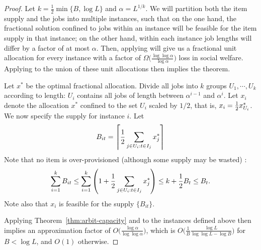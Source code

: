 \begin{proof}
  Let $k=\frac 12\min\{B,\log L\}$ and $\alpha=L^{1/k}$. We will
  partition both the item supply and the jobs into multiple instances,
  such that on the one hand, the fractional solution confined to jobs
  within an instance will be feasible for the item supply in that
  instance; on the other hand, within each instance job lengths will
  differ by a factor of at most $\alpha$. Then, applying
   will give us a fractional unit allocation
  for every instance with a factor of
  $\Omega\big(\frac{\log\log \alpha}{\log \alpha}\big)$ loss in social
  welfare. Applying  to the union of these unit
  allocations then implies the theorem.

  Let $x^*$ be the optimal fractional allocation. Divide all jobs into
  $k$ groups $U_1,\cdots,U_k$ according to length: $U_i$ contains all
  jobs of length between $\alpha^{i-1}$ and $\alpha^i$.  Let $x_i$ denote the
  allocation $x^*$ confined to the set $U_i$ scaled by $1/2$, that is,
  $x_i = \frac12 x^*_{U_i}$.  We now specify the supply for instance $i$. Let
  \[ B_{it} = \left\lceil\frac12\sum_{j\in U_i:t\in
      I_j}x^*_{j}\right\rceil\]
Note that no item is over-provisioned (although some supply may be wasted) :
    \begin{equation*}
        \sum_{i=1}^{k} B_{it} \leq \sum_{i=1}^{k}
                \left(1+\frac12\sum_{j\in U_i:t\in I_j}x^*_{j}\right) 
        \leq k+\frac{1}{2}B_t \leq B_t. 
    \end{equation*}
    Note also that $x_i$ is feasible for the supply $\{B_{it}\}$.

    Applying Theorem~\ref{thm:arbit-capacity} and  to
    the instances defined above then implies an approximation factor
    of $O\Big(\frac{\log \alpha}{\log\log \alpha}\Big)$, which is $O\Big(\frac
    1B\frac{\log L}{\log\log L-\log B}\Big)$ for $B<\log L$, and
    $O(1)$ otherwise.
\end{proof}



